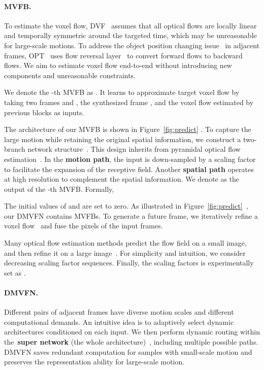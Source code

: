 \documentclass[10pt,twocolumn,letterpaper]{article}
\begin{document}
\paragraph{MVFB.} To estimate the voxel flow, DVF~\cite{dvf} assumes that all optical flows are locally linear and temporally symmetric around the targeted time, which may be unreasonable for large-scale motions. To address the object position changing issue~\cite{rife} in adjacent frames, OPT~\cite{wu2022optimizing} uses flow reversal layer~\cite{qvi} to convert forward flows to backward flows. We aim to estimate voxel flow end-to-end without introducing new components and unreasonable constraints.

We denote the -th MVFB as . It learns to approximate target voxel flow  by
taking two frames  and , the synthesized frame , and the voxel flow estimated by previous blocks  as inputs.

The architecture of our MVFB is shown in Figure~\ref{fig:predict} . To capture the large motion while retaining the original spatial information, we construct a two-branch network structure~\cite{yu2018bisenet}. This design inherits from pyramidal optical flow estimation~\cite{pwcnet,spynet}. In the \textbf{motion path}, the input is down-sampled by a scaling factor  to facilitate the expansion of the receptive field. Another \textbf{spatial path} operates at high resolution to complement the spatial information. We denote  as the output of the -th MVFB. Formally,

The initial values of  and  are set to zero. As illustrated in Figure~\ref{fig:predict}~, our DMVFN contains  MVFBs. To generate a future frame, we iteratively refine a voxel flow~\cite{dvf} and fuse the pixels of the input frames. 

Many optical flow estimation methods predict the flow field on a small image, and then refine it on a large image~\cite{pwcnet,gmflow}. For simplicity and intuition, we consider decreasing scaling factor sequences. Finally, the scaling factors is experimentally set as .

\iffalse 
Formally, 





where we denote the two-way convolution operations as  and . 
\fi




\paragraph{DMVFN.} Different pairs of adjacent frames have diverse motion scales and different computational demands. An intuitive idea is to adaptively select dynamic architectures conditioned on each input. We then perform dynamic routing within the~\textbf{super network} (the whole architecture)~\cite{dynamicnn}, including multiple possible paths. DMVFN saves redundant computation for samples with small-scale motion and preserves the representation ability for large-scale motion.
\end{document}
